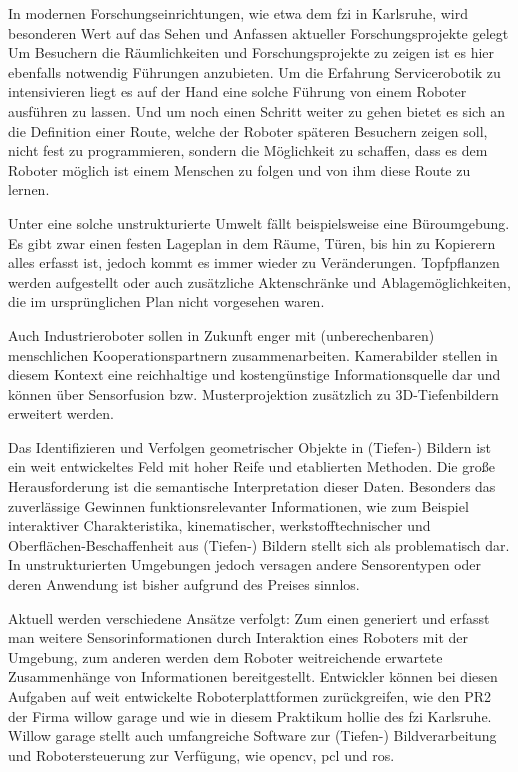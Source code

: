 In modernen Forschungseinrichtungen, wie etwa dem \gls{fzi} in Karlsruhe, wird besonderen Wert auf das Sehen und Anfassen aktueller Forschungsprojekte gelegt
Um Besuchern die Räumlichkeiten und Forschungsprojekte zu zeigen ist es hier ebenfalls notwendig Führungen anzubieten. Um die Erfahrung Servicerobotik zu intensivieren liegt es auf der Hand eine solche Führung von einem Roboter ausführen zu lassen. Und um noch einen Schritt weiter zu gehen bietet es sich an die Definition einer Route, welche der Roboter späteren Besuchern zeigen soll, nicht fest zu programmieren, sondern die Möglichkeit zu schaffen, dass es dem Roboter möglich ist einem Menschen zu folgen und von ihm diese Route zu lernen.

 
 
Unter eine solche unstrukturierte Umwelt fällt beispielsweise eine Büroumgebung. Es gibt zwar einen festen Lageplan in dem Räume, Türen, bis hin zu Kopierern alles erfasst ist, jedoch kommt es immer wieder zu Veränderungen. Topfpflanzen werden aufgestellt oder auch zusätzliche Aktenschränke und Ablagemöglichkeiten, die im ursprünglichen Plan nicht vorgesehen waren.
 
 Auch Industrieroboter sollen in Zukunft enger mit (unberechenbaren) menschlichen Kooperationspartnern zusammenarbeiten.
 Kamerabilder stellen in diesem Kontext eine reichhaltige und kostengünstige Informationsquelle dar und können über Sensorfusion bzw. Musterprojektion zusätzlich
 zu 3D-Tiefenbildern erweitert werden. 

Das Identifizieren und Verfolgen geometrischer Objekte in (Tiefen-) Bildern ist ein weit entwickeltes Feld mit hoher Reife und etablierten Methoden.
 Die große Herausforderung ist die semantische Interpretation dieser Daten. Besonders das zuverlässige Gewinnen funktionsrelevanter Informationen,
 wie zum Beispiel interaktiver Charakteristika, kinematischer, werkstofftechnischer und  Oberflächen-Beschaffenheit aus (Tiefen-) Bildern stellt sich
 als problematisch dar. In unstrukturierten Umgebungen jedoch versagen andere Sensorentypen oder deren Anwendung ist bisher aufgrund des Preises sinnlos.
 
Aktuell werden verschiedene Ansätze verfolgt: Zum einen generiert und erfasst man weitere Sensorinformationen durch Interaktion eines Roboters mit der Umgebung,
 zum anderen werden dem Roboter weitreichende erwartete Zusammenhänge von Informationen bereitgestellt. Entwickler können bei diesen Aufgaben auf weit entwickelte Roboterplattformen
 zurückgreifen, wie den PR2 der Firma willow garage und wie in diesem Praktikum
 \gls{hollie} des \gls{fzi} Karlsruhe. Willow garage stellt auch umfangreiche
 Software zur (Tiefen-) Bildverarbeitung und Robotersteuerung zur Verfügung,
 wie \gls{opencv}, \gls{pcl} und \gls{ros}.

